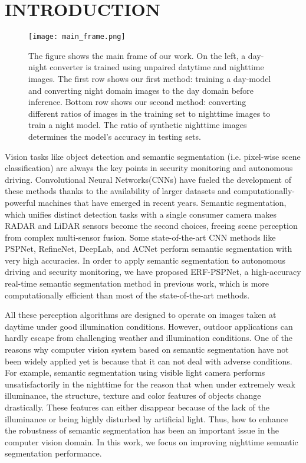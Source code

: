 \documentclass[a4paper]{spie}
\begin{document}
\section{INTRODUCTION}
\label{sec:intro}

\begin{figure}[ht]
   \centering
   \texttt{[image: main\_frame.png]}
   \caption{\label{fig:main_frame}
   The figure shows the main frame of our work. On the left, a day-night converter is trained using unpaired datytime and nighttime images. The first row shows our first method: training a day-model and converting night domain images to the day domain before inference. Bottom row shows our second method: converting different ratios of images in the training set to nighttime images to train a night model. The ratio of synthetic nighttime images determines the model's accuracy in testing sets.}
\end{figure}

Vision tasks like object detection and semantic segmentation (i.e. pixel-wise scene classification) are always the key points in security monitoring and autonomous driving. Convolutional Neural Networks(CNNs) have fueled the development of these methods thanks to the availability of larger datasets and computationally-powerful machines that have emerged in recent years. Semantic segmentation, which unifies distinct detection tasks with a single consumer camera\cite{yang2018unifying,yang2018unifyingterrainawareness,yang2018intersection} makes RADAR and LiDAR sensors become the second choices, freeing scene perception from complex multi-sensor fusion\cite{long2018fusion,pfeuffer2019robust,yang2016expanding}. Some state-of-the-art CNN methods like PSPNet\cite{zhao2017pyramid}, RefineNet\cite{lin2017refinenet}, DeepLab\cite{chen2017deeplab}, and ACNet\cite{hu2019acnet} perform semantic segmentation with very high accuracies. In order to apply semantic segmentation to autonomous driving and security monitoring, we have proposed ERF-PSPNet\cite{yang2018unifying,yang2019can}, a high-accuracy real-time semantic segmentation method in previous work, which is more computationally efficient than most of the state-of-the-art methods.

All these perception algorithms are designed to operate on images taken at daytime under good illumination conditions\cite{yang2019robustifying,cordts2016cityscapes,neuhold2017mapillary}. However, outdoor applications can hardly escape from challenging weather and illumination conditions. One of the reasons why computer vision system based on semantic segmentation have not been widely applied yet is because that it can not deal with adverse conditions. For example, semantic segmentation using visible light camera performs unsatisfactorily in the nighttime for the reason that when under extremely weak illuminance, the structure, texture and color features of objects change drastically. These features can either disappear because of the lack of the illuminance or being highly disturbed by artificial light. Thus, how to enhance the robustness of semantic segmentation has been an important issue in the computer vision domain\cite{romera2019bridging}. In this work, we focus on improving nighttime semantic segmentation performance.
\end{document}
